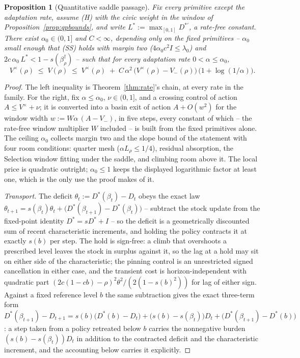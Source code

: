 \documentclass[11pt]{article}
\newtheorem{proposition}[theorem]{Proposition}
\theoremstyle{definition}
\theoremstyle{remark}
\numberwithin{equation}{section}
\begin{document}
\begin{proposition}[Quantitative saddle passage]\label{prop:passage}
Fix every primitive except the adaptation rate, assume (H) with the civic weight in the window of Proposition~\ref{prop:qpbounds}, and write $L^\ast := \max_{[0,1]} D^{\ast\prime}$, a rate-free constant. There exist $\alpha_0 \in (0,1]$ and $C < \infty$, depending only on the fixed primitives -- $\alpha_0$ small enough that (SS) holds with margin two ($4\alpha_0 c^2 I \le \lambda_0$) and $2c\,\alpha_0\,L^\ast < 1 - s(\beta^\dagger_\rho)$ -- such that for every adaptation rate $0 < \alpha \le \alpha_0$,
\[
V^{\times}(\rho) \;\le\; V(\rho) \;\le\; V^{\times}(\rho) \;+\; C\,\alpha^2\,\bigl(V^{\times}(\rho) - V_-(\rho)\bigr)\,\bigl(1 + \log(1/\alpha)\bigr).
\]
\end{proposition}
\begin{proof}
The left inequality is Theorem~\ref{thm:rate}'s chain, at every rate in the family. For the right, fix $\alpha \le \alpha_0$, $\nu \in (0,1]$, and a crossing control of action $A \le V^{\times} + \nu$; it is converted into a basin exit of action $A + O(w^2)$ for the window width $w := W\alpha\,(A - V_-)$, in five steps, every constant of which -- the rate-free window multiplier $W$ included -- is built from the fixed primitives alone. The ceiling $\alpha_0$ collects margin two and the slope bound of the statement with four room conditions: quarter mesh ($\alpha L_\rho \le 1/4$), residual absorption, the Selection window fitting under the saddle, and climbing room above it. The local price is quadratic outright; $\alpha_0 \le 1$ keeps the displayed logarithmic factor at least one, which is the only use the proof makes of it.

\emph{Transport.} The deficit $\theta_t := D^\ast(\beta_t) - D_t$ obeys the exact law $\theta_{t+1} = s(\beta_t)\theta_t + \bigl(D^\ast(\beta_{t+1}) - D^\ast(\beta_t)\bigr)$ -- subtract the stock update from the fixed-point identity $D^\ast = s D^\ast + I$ -- so the deficit is a geometrically discounted sum of recent characteristic increments, and holding the policy contracts it at exactly $s(b)$ per step. The hold is sign-free: a climb that overshoots a prescribed level leaves the stock in surplus against it, so the lag at a hold may sit on either side of the characteristic; the pinning control is an unrestricted signed cancellation in either case, and the transient cost is horizon-independent with quadratic part $(2c(1-cb)-\rho)^2\theta^2/(2(1-s(b)^2))$ for lag of either sign. Against a fixed reference level $b$ the same subtraction gives the exact three-term form $D^\ast(\beta_{t+1}) - D_{t+1} = s(b)\bigl(D^\ast(b) - D_t\bigr) + \bigl(s(b) - s(\beta_t)\bigr)D_t + \bigl(D^\ast(\beta_{t+1}) - D^\ast(b)\bigr)$: a step taken from a policy retreated below $b$ carries the nonnegative burden $(s(b)-s(\beta_t))D_t$ in addition to the contracted deficit and the characteristic increment, and the accounting below carries it explicitly.


\end{proof}
\end{document}

